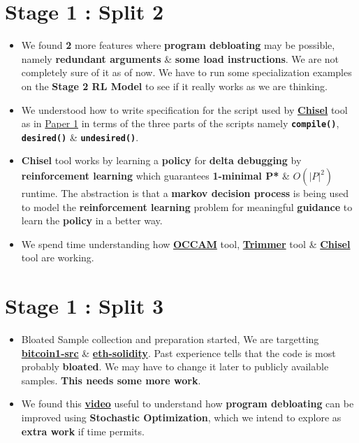 \documentclass{article} %
\begin{document}
\section*{\color{darkmidnightblue} Stage 1 : Split 2}
\begin{itemize}
	\item We found \textbf{2} more features where \textbf{program debloating} may be possible, namely \textbf{\color{ao(english)} redundant arguments} \& \textbf{\color{ao(english)} some load instructions}. We are not completely sure of it as of now. We have to run some specialization examples on the \textbf{Stage 2 RL Model} to see if it really works as we are thinking.
	\item We understood how to write specification for the script used by \textbf{\href{https://github.com/aspire-project/chisel}{Chisel}} tool as in \href{https://dl.acm.org/doi/10.1145/3243734.3243838}{Paper 1} in terms of the three parts of the scripts namely \textbf{\texttt{compile()}}, \textbf{\texttt{desired()}} \& \texttt{\textbf{undesired()}}.
	\item \textbf{Chisel} tool works by learning a \textbf{policy} for \textbf{delta debugging} by \textbf{reinforcement learning} which guarantees \textbf{1-minimal P*} \& $\textbf{$O(|P|^2)$}$ runtime. The abstraction is that a \textbf{markov decision process} is being used to model the \textbf{reinforcement learning} problem for meaningful \textbf{guidance} to learn the \textbf{policy} in a better way.
	\item We spend time understanding how \textbf{\href{https://github.com/ashish-gehani/OCCAM}{OCCAM}} tool, \textbf{\href{http://www.csl.sri.com/users/gehani/papers/ASE-2018.Trimmer.pdf}{Trimmer}} tool \& \textbf{\href{https://github.com/aspire-project/chisel}{Chisel}} tool are working.
\end{itemize}

\section*{\color{darkmidnightblue} Stage 1 : Split 3}
\begin{itemize}
	\item Bloated Sample collection and preparation started, We are targetting \href{https://github.com/bitcoin/bitcoin}{\textbf{bitcoin1-src}} \& \href{https://github.com/ethereum/solidity}{\textbf{eth-solidity}}. Past experience tells that the code is most probably \textbf{bloated}. We may have to change it later to publicly available samples. \textbf{\color{darkmidnightblue}This needs some more work}.
	\item We found this \textbf{\href{https://www.youtube.com/watch?v=hC4zIwyv1bg}{video}} useful to understand how \textbf{program debloating} can be improved using \textbf{Stochastic Optimization}, which we intend to explore as \textbf{extra work} if time permits.
\end{itemize}
\end{document}
